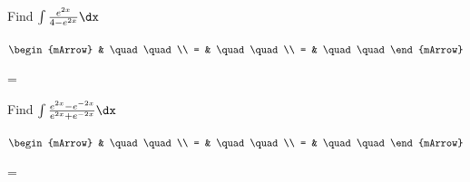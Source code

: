 \begin{mtask}[resume]
   \task \begin{exercise} Find $\int \frac{e^{2x}}{4-e^{2x}} \dx$
           \begin{envSolution}
             $\begin{mArrow}
                   & \quad \quad              \\
		   		 = & \quad \quad              \\
				 = & \quad \quad 
              \end{mArrow}$
            \begin{shortsolution}  
			     =$ \quad \quad \quad \quad$
			\end{shortsolution}				 
           \end{envSolution}
         \end{exercise}

   \task \begin{exercise} Find $\int \frac{e^{2x}-e^{-2x}}{e^{2x}+e^{-2x}} \dx$
           \begin{envSolution}
             $\begin{mArrow}
                   & \quad \quad              \\
		   		 = & \quad \quad              \\
				 = & \quad \quad 
              \end{mArrow}$
            \begin{shortsolution}  
			     =$ \quad \quad \quad \quad$
			\end{shortsolution}				 
           \end{envSolution}
         \end{exercise}
\end{mtask}


